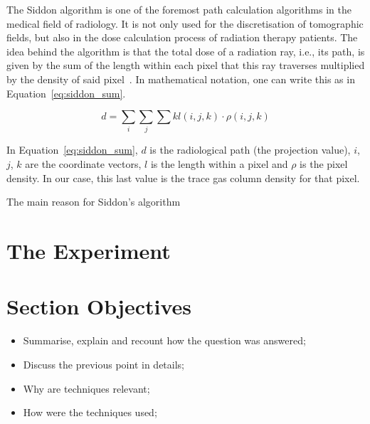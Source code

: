 The Siddon algorithm is one of the foremost path calculation algorithms
in the medical field of radiology. It is not only used for the
discretisation of tomographic fields, but also in the dose calculation
process of radiation therapy patients. The idea behind the algorithm is
that the total dose of a radiation ray, i.e., its path, is given by the
sum of the length within each pixel that this ray traverses multiplied
by the density of said pixel~. In mathematical
notation, one can write this as in Equation~\ref{eq:siddon_sum}.

\begin{equation}
    \label{eq:siddon_sum}
    d = \sum_{i}\sum_{j}\sum{k} l(i, j, k)\cdot\rho(i, j, k)
\end{equation}

In Equation~\ref{eq:siddon_sum}, $d$ is the radiological path (the
projection value), $i$, $j$, $k$ are the coordinate vectors, $l$ is the
length within a pixel and $\rho$ is the pixel density. In our case, this
last value is the trace gas column density for that pixel.

The main reason for Siddon's algorithm 









\section{The Experiment}%
\label{sec:the_experiment}








\section{Section Objectives}%
\label{sec:section_objectives}

\begin{itemize}
    \item Summarise, explain and recount how the question was answered;
    \item Discuss the previous point in details;
    \item Why are techniques relevant;
    \item How were the techniques used;
\end{itemize}

